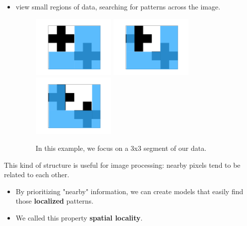     \begin{itemize}
        \item {} view small regions of data, searching for patterns across the image.

        \begin{figure}[H]
            \includegraphics[width=40mm,scale=0.5]{images/convolutional_neural_networks_images/window.png}
            \includegraphics[width=40mm,scale=0.5]{images/convolutional_neural_networks_images/window2.png}
            \includegraphics[width=40mm,scale=0.5]{images/convolutional_neural_networks_images/window3.png}
            
            \caption*{In this example, we focus on a 3x3 segment of our data.}
        \end{figure}

        
    \end{itemize}

    This kind of structure is useful for image processing: nearby pixels tend to be related to each other.

    \begin{itemize}
        \item By prioritizing "nearby" information, we can create models that easily find those \textbf{localized} patterns.
        
        \item We called this property \textbf{spatial locality}.
    \end{itemize}

